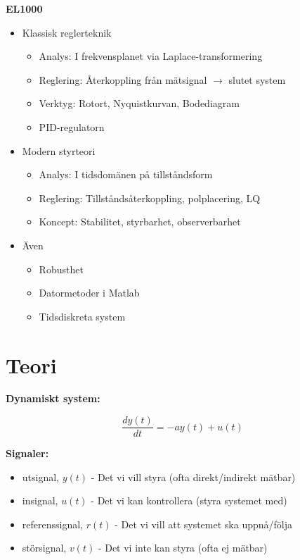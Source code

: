 \documentclass[12pt]{article}
\begin{document}
\textbf{EL1000}
\begin{itemize}
\item Klassisk reglerteknik
  \begin{itemize}
  \item Analys: I frekvensplanet via Laplace-transformering
  \item Reglering: Återkoppling från mätsignal $\rightarrow$ slutet system
  \item Verktyg: Rotort, Nyquistkurvan, Bodediagram
  \item PID-regulatorn
  \end{itemize}
\item Modern styrteori
  \begin{itemize}
  \item Analys: I tidsdomänen på tillståndsform
  \item Reglering: Tillståndsåterkoppling, polplacering, LQ
  \item Koncept: Stabilitet, styrbarhet, observerbarhet
  \end{itemize}
\item Även
  \begin{itemize}
  \item Robusthet
  \item Datormetoder i Matlab
  \item Tidsdiskreta system
  \end{itemize}
\end{itemize}

\section*{Teori}

\textbf{Dynamiskt system:} \hspace*{10pt} 

\begin{equation}
\dfrac{dy(t)}{dt} = -ay(t) + u(t)\label{eq:dynsys}
\end{equation}


\textbf{Signaler:}
\begin{itemize}
\item utsignal, $y(t)$ - Det vi vill styra (ofta direkt/indirekt mätbar)
\item insignal, $u(t)$ - Det vi kan kontrollera (styra systemet med)
\item referenssignal, $r(t)$ - Det vi vill att systemet ska uppnå/följa
\item störsignal, $v(t)$ - Det vi inte kan styra (ofta ej mätbar)
\end{itemize}
\end{document}

